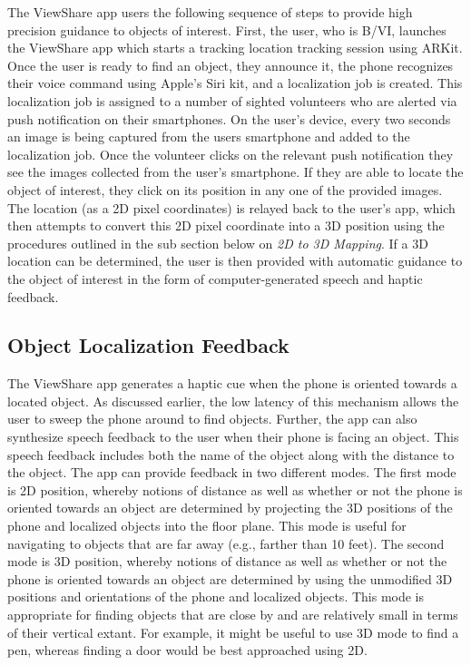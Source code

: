 \documentclass[chi_draft]{sigchi}
\newcommand{\BVI}{B/VI\xspace}
\begin{document}
The ViewShare app users the following sequence of steps to provide high precision guidance to objects of interest.  First, the user, who is \BVI, launches the ViewShare app which starts a tracking location tracking session using ARKit.  Once the user is ready to find an object, they announce it, the phone recognizes their voice command using Apple's Siri kit, and a localization job is created.  This localization job is assigned to a number of sighted volunteers who are alerted via push notification on their smartphones.  On the user's device, every two seconds an image is being captured from the users smartphone and added to the localization job.  Once the volunteer clicks on the relevant push notification they see the images collected from the user's smartphone.  If they are able to locate the object of interest, they click on its position in any one of the provided images.  The location (as a 2D pixel coordinates) is relayed back to the user's app, which then attempts to convert this 2D pixel coordinate into a 3D position using the procedures outlined in the sub section below on \emph{2D to 3D Mapping}.  If a 3D location can be determined, the user is then provided with automatic guidance to the object of interest in the form of computer-generated speech and haptic feedback.

\subsection{Object Localization Feedback}
The ViewShare app generates a haptic cue when the phone is oriented towards a located object.  As discussed earlier, the low latency of this mechanism allows the user to sweep the phone around to find objects.  Further, the app can also synthesize speech feedback to the user when their phone is facing an object.  This speech feedback includes both the name of the object along with the distance to the object.  The app can provide feedback in two different modes.  The first mode is 2D position, whereby notions of distance as well as whether or not the phone is oriented towards an object are determined by projecting the 3D positions of the phone and localized objects into the floor plane.  This mode is useful for navigating to objects that are far away (e.g., farther than 10 feet).  The second mode is 3D position, whereby notions of distance as well as whether or not the phone is oriented towards an object are determined by using the unmodified 3D positions and orientations of the phone and localized objects.  This mode is appropriate for finding objects that are close by and are relatively small in terms of their vertical extant.  For example, it might be useful to use 3D mode to find a pen, whereas finding a door would be best approached using 2D.
\end{document}
